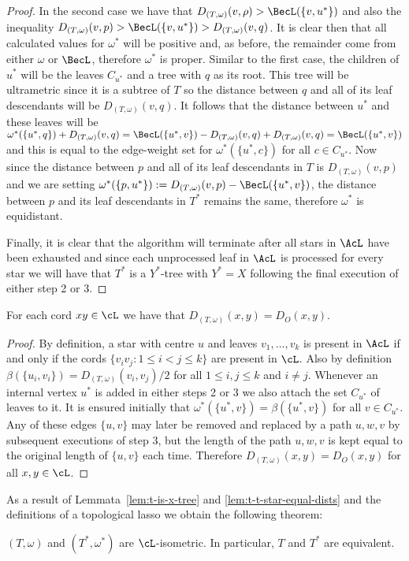 \begin{proof}
  In the second case we have that $D_{(T,\omega)}(v,\rho) > \BecL(\{v,u^*\})$
  and also the inequality $D_{(T,\omega)}(v,p) > \BecL(\{v,u^*\}) >
  D_{(T,\omega)}(v,q)$.  It is clear then that all calculated values for
  $\omega^*$ will be positive and, as before, the remainder come from either
  $\omega$ or $\BecL$, therefore $\omega^*$ is proper.  Similar to the first
  case, the children of $u^*$ will be the leaves $C_{u^*}$ and a tree with $q$
  as its root.  This tree will be ultrametric since it is a subtree of $T$ so
  the distance between $q$ and all of its leaf descendants will be
  $D_{(T,\omega)}(v,q)$.  It follows that the distance between $u^*$ and these
  leaves will be $\omega^*(\{u^*,q\}) + D_{(T,\omega)}(v,q) = \BecL(\{u^*,v\})
  - D_{(T,\omega)}(v,q) + D_{(T,\omega)}(v,q) = \BecL(\{u^*,v\})$ and this is
  equal to the edge-weight set for $\omega^*(\{u^*,c\})$ for all $c \in
  C_{u^*}$.  Now since the distance between $p$ and all of its leaf
  descendants in $T$ is $D_{(T,\omega)}(v,p)$ and we are setting
  $\omega^*(\{p,u^*\}) := D_{(T,\omega)}(v,p) - \BecL(\{u^*,v\})$, the
  distance between $p$ and its leaf descendants in $T^*$ remains the same,
  therefore $\omega^*$ is equidistant.

  Finally, it is clear that the algorithm will terminate after all stars in
  $\AcL$ have been exhausted and since each unprocessed leaf in $\AcL$ is
  processed for every star we will have that $T^*$ is a $Y^*$-tree with $Y^* =
  X$ following the final execution of either step 2 or 3.
\end{proof}

\begin{lem}
  \label{lem:t-t-star-equal-dists}
  For each cord $xy \in \cL$ we have that $D_{(T,\omega)}(x,y) = D_O(x,y)$.
\end{lem}

\begin{proof}
  By definition, a star with centre $u$ and leaves $v_1,\dotsc,v_k$ is present
  in $\AcL$ if and only if the cords $\{v_iv_j \colon 1 \leq i < j \leq k\}$
  are present in $\cL$.  Also by definition $\beta(\{u_i,v_i\}) =
  D_{(T,\omega)}(v_i,v_j)/2$ for all $1 \leq i,j \leq k$ and $i \neq j$.
  Whenever an internal vertex $u^*$ is added in either steps 2 or 3 we also
  attach the set $C_{u^*}$ of leaves to it.  It is ensured initially that
  $\omega^*(\{u^*,v\}) = \beta(\{u^*,v\})$ for all $v \in C_{u^*}$.  Any of
  these edges $\{u,v\}$ may later be removed and replaced by a path $u,w,v$ by
  subsequent executions of step 3, but the length of the path $u,w,v$ is kept
  equal to the original length of $\{u,v\}$ each time.  Therefore
  $D_{(T,\omega)}(x,y) = D_O(x,y)$ for all $x,y \in \cL$.
\end{proof}

As a result of Lemmata~\ref{lem:t-is-x-tree} and
\ref{lem:t-t-star-equal-dists} and the definitions of a topological lasso we
obtain the following theorem:

\begin{thm}
  \label{thm:t-t-star-l-isometric}
  $(T,\omega)$ and $(T^*,\omega^*)$ are $\cL$-isometric.  In particular, $T$
  and $T^*$ are equivalent.
\end{thm}

